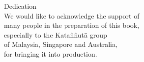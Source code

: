 
\vspace*{4\baselineskip}

{\centering

\begin{minipage}{0.9\linewidth}
\centering\small
Dedication\\[\onelineskip]
We would like to acknowledge the support of\\
many people in the preparation of this book,\\
especially to the Kata\~n\~nut\=a group\\
of Malaysia, Singapore and Australia,\\
for bringing it into production.

\end{minipage}

}
